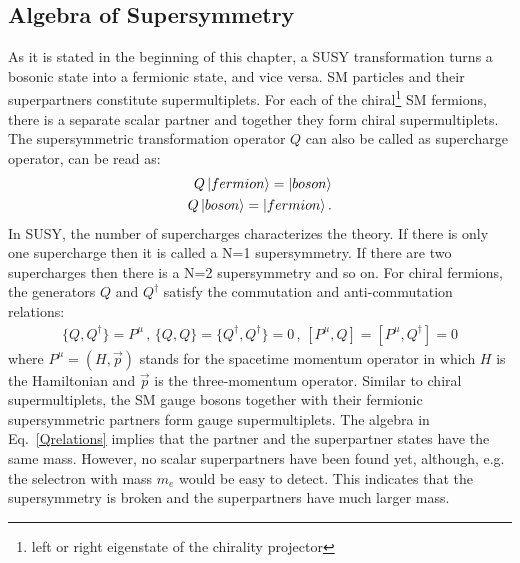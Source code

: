 \subsection{Algebra of Supersymmetry}
\label{sec:Albsusy}
As it is stated in the beginning of this chapter, a SUSY transformation turns a bosonic state into a fermionic state, and vice versa. SM particles and their superpartners constitute supermultiplets. For each of the chiral\footnote{left or right eigenstate of the chirality projector} SM fermions, there is a separate scalar partner and together they form chiral supermultiplets. The supersymmetric transformation operator $Q$ can also be called as supercharge operator, can be read as:
\begin{eqnarray}
\label{Q}
Q\ket{fermion} = \ket{boson} \nonumber\\
Q\ket{boson} = \ket{fermion}.
\end{eqnarray}
In SUSY, the number of supercharges characterizes the theory. If there is only one supercharge then it is called a N=1 supersymmetry.  If there are two supercharges then there is a N=2 supersymmetry and so on. 
For chiral fermions, the generators $Q$ and $Q^{\dagger}$ satisfy the commutation and anti-commutation relations:
\begin{eqnarray}
\label{Qrelations}
{\{Q,Q^{\dagger}\}=P^{\mu} \, , \, \{Q,Q\}=\{Q^{\dagger},Q^{\dagger}\}=0 \,,\, [P^{\mu},Q]=[P^{\mu},Q^{\dagger}]=0}
\end{eqnarray}
where $P^{\mu}=(H,\overrightarrow{p})$ stands for the spacetime momentum operator in which $H$ is the Hamiltonian and $\overrightarrow{p}$ is the three-momentum operator. 
Similar to chiral supermultiplets, the SM gauge bosons together with their fermionic supersymmetric partners form gauge supermultiplets.
The algebra in Eq.~\ref{Qrelations} implies that the partner and the superpartner states have the same mass. However, no scalar superpartners have been found yet, although, e.g. the selectron with mass $m_e$ would be easy to detect. This indicates that the supersymmetry is broken and the superpartners have much larger mass.
